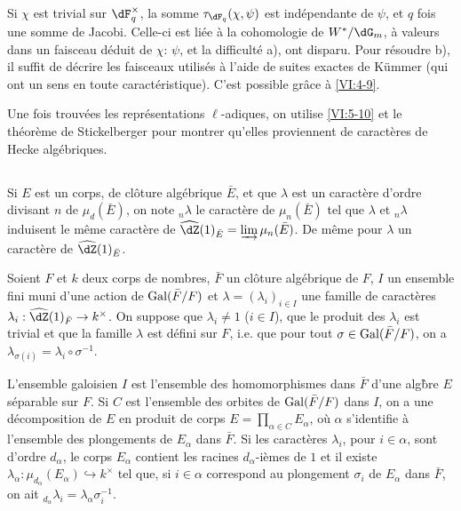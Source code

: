 Si $\chi$ est trivial sur $\dF_q^\times$, la somme $\tau_{\dF_q}(\chi,\psi)$ 
est indépendante de $\psi$, et $q$ fois une somme de Jacobi. Celle-ci est 
liée à la cohomologie de $W^\ast/\dG_m$, à valeurs dans un faisceau 
déduit de $\chi$: $\psi$, et la difficulté a), ont disparu. Pour 
résoudre b), il suffit de décrire les faisceaux utilisés à l'aide de 
suites exactes de K\"ummer (qui ont un sens en toute caractéristique). C'est 
possible gr\^ace à \ref{VI:4-9}. 

Une fois trouvées les représentations $\ell$-adiques, on utilise 
\ref{VI:5-10} et le théorème de Stickelberger pour montrer qu'elles 
proviennent de caractères de Hecke algébriques. 





\subsection{}\label{VI:6-1}

Si $E$ est un corps, de clôture algébrique $\bar E$, et que $\lambda$ est 
un caractère d'ordre divisant $n$ de $\mu_d(\bar E)$, on note $_n\lambda$ le 
caractère de $\mu_n(\bar E)$ tel que $\lambda$ et $_n \lambda$ induisent le 
même caractère de $\widehat\dZ(1)_{\bar E} = \varinjlim \mu_n(\bar E)$. De 
même pour $\lambda$ un caractère de $\widehat\dZ(1)_{\bar E}$. 

Soient $F$ et $k$ deux corps de nombres, $\bar F$ un clôture algébrique de 
$F$, $I$ un ensemble fini muni d'une action de $\operatorname{Gal}(\bar F/F)$ et 
$\lambda=(\lambda_i)_{i\in I}$ une famille de caractères 
$\lambda_i:\widehat\dZ(1)_{\bar F} \to k^\times$. On suppose que 
$\lambda_i\ne 1$ ($i\in I$), que le produit des $\lambda_i$ est trivial et que 
la famille $\lambda$ est défini sur $F$, i.e. que pour tout 
$\sigma\in \operatorname{Gal}(\bar F/F)$, on a 
$\lambda_{\sigma(i)}=\lambda_i\circ \sigma^{-1}$. 

L'ensemble galoisien $I$ est l'ensemble des homomorphismes dans $\bar F$ d'une 
alg\`bre $E$ séparable sur $F$. Si $C$ est l'ensemble des orbites de 
$\operatorname{Gal}(\bar F/F)$ dans $I$, on a une décomposition de $E$ en produit de corps 
$E=\prod_{\alpha\in C} E_\alpha$, où $\alpha$ s'identifie à l'ensemble des 
plongements de $E_\alpha$ dans $\bar F$. Si les caractères $\lambda_i$, pour 
$i\in \alpha$, sont d'ordre $d_\alpha$, le corps $E_\alpha$ contient les 
racines $d_\alpha$-ièmes de $1$ et il existe 
$\lambda_\alpha:\mu_{d_\alpha}(E_\alpha) \hookrightarrow k^\times$  tel que, si 
$i\in \alpha$ correspond au plongement $\sigma_i$ de $E_\alpha$ dans $\bar F$, 
on ait $_{d_\alpha} \lambda_i = \lambda_\alpha \sigma_i^{-1}$. 





